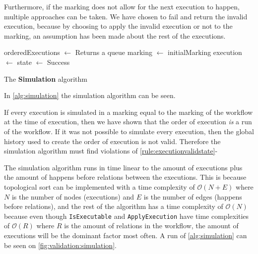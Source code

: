 	\newpar Furthermore, if the marking does not allow for the next execution to happen, multiple approaches can be taken. We have chosen to fail and return the invalid execution, because by choosing to apply the invalid execution or not to the marking, an assumption has been made about the rest of the executions.
	
	\begin{algorithm}[H]
		\begin{algorithmic}
			\State orderedExecutions $\leftarrow$  \Comment Returns a queue
			\State marking $\leftarrow$ initialMarking
				\State execution $\leftarrow$ 
					\State\Return{}
				\EndIf
				\State state $\leftarrow$ 
			\EndWhile
			\State\Return Success
			\EndFunction
		\end{algorithmic}
		\caption{The \textbf{Simulation} algorithm}
		\label{alg:simulation}
	\end{algorithm}
	
	\newpar In \autoref{alg:simulation} the simulation algorithm can be seen.
	
	If every execution is simulated in a marking equal to the marking of the workflow at the time of execution, then we have shown that the order of execution \textit{is} a run of the workflow. If it was not possible to simulate every execution, then the global history used to create the order of execution is not valid. Therefore the simulation algorithm must find violations of \autoref{rule:executionvalidstate}-
	
	\newpar The simulation algorithm runs in time linear to the amount of executions plus the amount of happens before relations between the executions. This is because topological sort can be implemented with a time complexity of $\mathcal{O}(N + E)$ where $N$ is the number of nodes (executions) and $E$ is the number of edges (happens before relations), and the rest of the algorithm has a time complexity of $\mathcal{O}(N)$ because even though \texttt{IsExecutable} and \texttt{ApplyExecution} have time complexities of $\mathcal{O}(R)$ where $R$ is the amount of relations in the workflow, the amount of executions will be the dominant factor most often. A run of \autoref{alg:simulation} can be seen on \autoref{fig:validation:simulation}.
	
